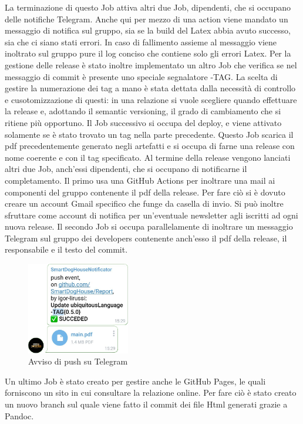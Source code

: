         La terminazione di questo Job attiva altri due Job, dipendenti, che si occupano delle notifiche Telegram. Anche qui per mezzo di una action viene mandato un messaggio di notifica sul gruppo, sia se la build del Latex abbia avuto successo, sia che ci siano stati errori. In caso di fallimento assieme al messaggio viene inoltrato sul gruppo pure il log conciso che contiene solo gli errori Latex. 
        Per la gestione delle release è stato inoltre implementato un altro Job che verifica se nel messaggio di commit è presente uno speciale segnalatore -TAG{}. 
        La scelta di gestire la numerazione dei tag a mano è stata dettata dalla necessità di controllo e cusotomizzazione di questi: in una relazione si vuole scegliere quando effettuare la release e, adottando il semantic versioning, il grado di cambiamento che si ritiene più opportuno.
        Il Job successivo si occupa del deploy, e viene attivato solamente se è stato trovato un tag nella parte precedente. Questo Job scarica il pdf precedentemente generato negli artefatti e si occupa di farne una release con nome coerente e con il tag specificato. 
        Al termine della release vengono lanciati altri due Job, anch'essi dipendenti, che si occupano di notificarne il completamento. 
        Il primo usa una GitHub Actions per inoltrare una mail ai componenti del gruppo contenente il pdf della release. Per fare ciò si è dovuto creare un account Gmail specifico che funge da casella di invio. Si può inoltre sfruttare come account di notifica per un'eventuale newsletter agli iscritti ad ogni nuova release. 
        Il secondo Job si occupa parallelamente di inoltrare un messaggio Telegram sul gruppo dei developers contenente anch'esso il pdf della release, il responsabile e il testo del commit. 
        \begin{figure}[H]
            \caption{Avviso di push su Telegram}
            \centering
           \includegraphics[width=0.4\textwidth]{Images/pushTelegram.png}
        \end{figure}
        Un ultimo Job è stato creato per gestire anche le GitHub Pages, le quali forniscono un sito in cui consultare la relazione online. Per fare ciò è stato   creato un nuovo branch sul quale viene fatto il commit dei file Html generati grazie a Pandoc.
